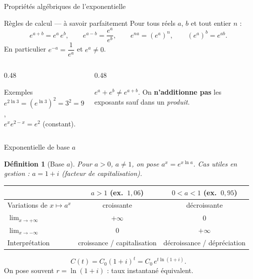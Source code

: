 \documentclass[10pt,aspectratio=169]{beamer}
\newcounter{dummy}
\numberwithin{dummy}{section}
\newtheorem{mydef}[dummy]{Définition}
\begin{document}
\begin{frame}{Propriétés algébriques de l'exponentielle}
\begin{block}{Règles de calcul --- à savoir parfaitement}
Pour tous réels $a$, $b$ et tout entier $n$ :
\[
e^{a+b}=e^a\,e^b,\qquad
e^{a-b}=\frac{e^a}{e^b},\qquad
e^{na}=(e^a)^n,\qquad
(e^a)^b=e^{ab}.
\]
En particulier $e^{-a}=\dfrac{1}{e^a}$ et $e^a\neq 0$.
\end{block}

\vspace{0.3em}
\begin{columns}[T]
\begin{column}{0.48\textwidth}
\begin{exampleblock}{Exemples}
$e^{2\ln 3}=(e^{\ln 3})^2=3^2=9$,\\[0.3em]
$e^{x}e^{2-x}=e^{2}$ (constant).
\end{exampleblock}
\end{column}
\begin{column}{0.48\textwidth}
\begin{boxattention}
$e^a+e^b \neq e^{a+b}$.
On \textbf{n'additionne pas} les exposants sauf dans un \emph{produit}.
\end{boxattention}
\end{column}
\end{columns}
\end{frame}

\begin{frame}{Exponentielle de base $a$}
\begin{mydef}[Base $a$]
Pour $a>0$, $a\neq 1$, on pose $a^x=e^{x\ln a}$.
Cas utiles en gestion : $a=1+i$ (facteur de capitalisation).
\end{mydef}

\vspace{0.2em}
\renewcommand{\arraystretch}{1.3}
\begin{center}
\begin{tabular}{@{}lcc@{}}
\toprule
 & $a>1$ (ex.\ $1{,}06$) & $0<a<1$ (ex.\ $0{,}95$) \\
\midrule
Variations de $x\mapsto a^x$ & croissante & décroissante \\
$\lim_{x\to+\infty}$ & $+\infty$ & $0$ \\
$\lim_{x\to-\infty}$ & $0$ & $+\infty$ \\
Interprétation & croissance / capitalisation & décroissance / dépréciation \\
\bottomrule
\end{tabular}
\end{center}

\vspace{0.45em}
\begin{boxmethode}
\[
C(t)=C_0(1+i)^t = C_0\, e^{t\ln(1+i)}.
\]
On pose souvent $r=\ln(1+i)$ : taux instantané équivalent.
\end{boxmethode}
\end{frame}
\end{document}
